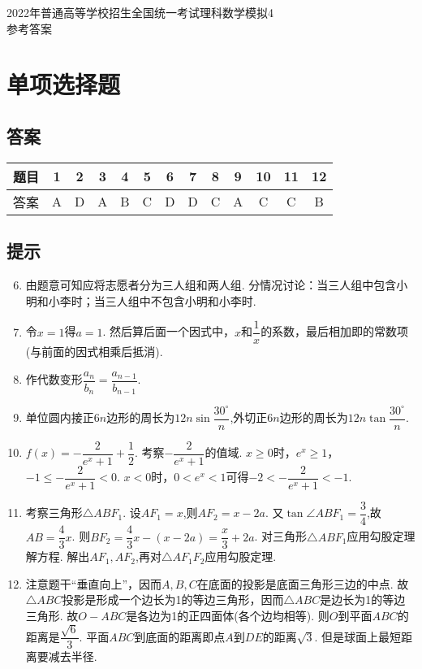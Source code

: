 \documentclass[11pt]{article}
\begin{document}
	\begin{center}
		\songti \Large 2022年普通高等学校招生全国统一考试理科数学模拟4
		\\ \heiti 参考答案
	\end{center}
\section{\heiti 单项选择题}
\subsection{\heiti 答案}
\begin{center}
	\begin{tabular}{ccccccccccccc}
		\hline 
		题目 & 1 & 2 & 3 & 4 & 5 & 6 & 7 & 8 & 9 & 10 & 11 & 12 \\
		\hline
		答案 & A & D & A & B & C & D & D & C & A & C & C & B \\
		\hline
	\end{tabular}
\end{center}
\subsection{\heiti 提示}
\begin{enumerate}
	\setcounter{enumi}{5}
	\item 由题意可知应将志愿者分为三人组和两人组. 分情况讨论：当三人组中包含小明和小李时；当三人组中不包含小明和小李时.
	\item 令$ x=1 $得$ a=1 $. 然后算后面一个因式中，$ x $和$ \dfrac{1}{x} $的系数，最后相加即的常数项(与前面的因式相乘后抵消).
	\item 作代数变形$ \dfrac{a_n}{b_n}=\dfrac{a_{n-1} }{b_{n-1}} $.
	\item 单位圆内接正$ 6n $边形的周长为$ 12n \sin \dfrac{30^\circ}{n} $,外切正$ 6n $边形的周长为$ 12n \tan \dfrac{30^\circ}{n} $.
	\item $ f(x)=-\dfrac{2}{e^x+1}+\dfrac{1}{2} $. 考察$ -\dfrac{2}{e^x+1} $的值域. $ x\geqslant0 $时，$ e^x\geqslant1 $，$ -1 \leqslant -\dfrac{2}{e^x+1}<0 $. $ x<0 $时，$ 0<e^x<1 $可得$ -2<-\dfrac{2}{e^x+1}<-1 $.
	\item 考察三角形$ \triangle ABF_1 $. 设$ AF_1=x $,则$ AF_2=x-2a $. 又$ \tan \angle ABF_1 =\dfrac{3}{4} $,故$ AB=\dfrac{4}{3}x $. 则$ BF_2=\dfrac{4}{3}x-(x-2a)=\dfrac{x}{3}+2a $. 对三角形$ \triangle ABF_1 $应用勾股定理解方程. 解出$ AF_1,AF_2 $,再对$ \triangle AF_1F_2 $应用勾股定理.
	\item 注意题干“垂直向上”，因而$ A,B,C $在底面的投影是底面三角形三边的中点. 故$ \triangle ABC $投影是形成一个边长为1的等边三角形，因而$ \triangle ABC $是边长为1的等边三角形. 故$ O-ABC $是各边为1的正四面体(各个边均相等). 则$ O $到平面$ ABC $的距离是$ \dfrac{\sqrt{6}}{3} $. 平面$ ABC $到底面的距离即点$ A $到$ DE $的距离$ \sqrt{3} $. 但是球面上最短距离要减去半径.
\end{enumerate}
\end{document}
